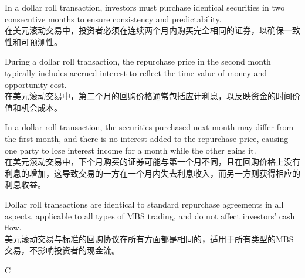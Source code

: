 \documentclass{article}
\begin{document}
\begin{choices}
    \item In a dollar roll transaction, investors must purchase identical securities in two consecutive months to ensure consistency and predictability.\\
    在美元滚动交易中，投资者必须在连续两个月内购买完全相同的证券，以确保一致性和可预测性。
    \item During a dollar roll transaction, the repurchase price in the second month typically includes accrued interest to reflect the time value of money and opportunity cost.\\
    在美元滚动交易中，第二个月的回购价格通常包括应计利息，以反映资金的时间价值和机会成本。
    \item In a dollar roll transaction, the securities purchased next month may differ from the first month, and there is no interest added to the repurchase price, causing one party to lose interest income for a month while the other gains it.\\
    在美元滚动交易中，下个月购买的证券可能与第一个月不同，且在回购价格上没有利息的增加，这导致交易的一方在一个月内失去利息收入，而另一方则获得相应的利息收益。
    \item Dollar roll transactions are identical to standard repurchase agreements in all aspects, applicable to all types of MBS trading, and do not affect investors' cash flow.\\
    美元滚动交易与标准的回购协议在所有方面都是相同的，适用于所有类型的MBS交易，不影响投资者的现金流。
\end{choices}

\begin{correctanswer}
    C
\end{correctanswer}
\end{document}
